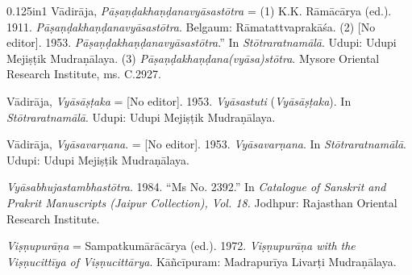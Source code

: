 \begin{hangparas}{0.125in}{1}
          \label{VP}Vādirāja, \emph{{Pāṣaṇḍakhaṇḍanavyāsastōtra}} = (1) K.\thinskip{}K. Rāmācārya (ed.). 1911. \emph{{Pāṣaṇḍakhaṇḍanavyāsastōtra}}. Belgaum: Rāmatattvaprakāśa. (2) [No editor]. 1953. \emph{{Pāṣaṇḍakhaṇḍanavyāsastōtra}}.” In \emph{{Stōtraratnamālā}}. Udupi: Udupi Mejiṣṭik Mudraṇālaya. (3) \emph{{Pā\-ṣaṇ\-ḍa\-khaṇ\-ḍana\-(vyāsa)\-stō\-tra}}. Mysore Oriental Research Institute, ms. C.2927. 
	  \medskip


          \label{Vyasastaka}Vādirāja, \emph{{Vyāsāṣṭaka}} = [No editor]. 1953. \emph{{Vyāsastuti}} (\emph{{Vyāsāṣṭaka}}). In \emph{{Stōtraratnamālā}}. Udupi: Udupi Mejiṣṭik Mudraṇālaya.\medskip


          \label{Vyasavarnana}Vādirāja, \emph{{Vyāsavarṇana}}. = [No editor]. 1953. \emph{{Vyāsavarṇana}}. In \emph{{Stōtraratnamālā}}. Udupi: Udupi Mejiṣṭik Mudraṇālaya.\medskip


          \emph{{Vyāsabhujastambhastōtra}}. 1984. “Ms No. 2392.” In \emph{Catalogue of Sanskrit and Prakrit Manuscripts (Jaipur Collection), Vol. 18.} Jodhpur: Rajasthan Oriental Research Institute.\medskip


	  \label{Visnupurana}\emph{{Viṣṇupurāṇa}} = Sampatkumārācārya (ed.). 1972. \emph{Viṣṇupurāṇa with the Viṣṇucittīya of Viṣṇucittārya}. Kāñcīpuram: Madrapurīya Livarṭi Mudraṇālaya.\medskip


	
\end{hangparas}

